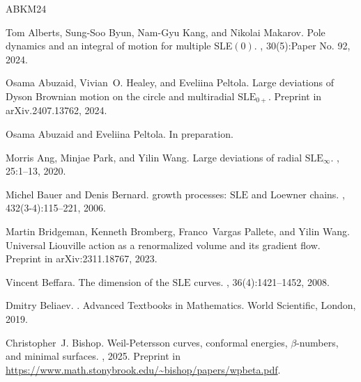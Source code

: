 \documentclass[a4paper, 11pt]{article}
\theoremstyle{definition}
\numberwithin{equation}{section}
\numberwithin{figure}{section}
\begin{document}

\bigskip


\begin{thebibliography}{ABKM24}

Tom Alberts, Sung-Soo Byun, Nam-Gyu Kang, and Nikolai Makarov.
\newblock Pole dynamics and an integral of motion for multiple {SLE$(0)$}.
, 30(5):Paper No. 92, 2024.

Osama Abuzaid, Vivian~O. Healey, and Eveliina Peltola.
\newblock Large deviations of {D}yson {B}rownian motion on the circle and
  multiradial {$\mathrm{SLE}_{0+}$}.
\newblock Preprint in arXiv.2407.13762, 2024.

Osama Abuzaid and Eveliina Peltola.
\newblock In preparation.

Morris Ang, Minjae Park, and Yilin Wang.
\newblock Large deviations of radial {${\mathrm{SLE}_{\infty}}$}.
, 25:1--13, 2020.

Michel Bauer and Denis Bernard.
 growth processes: {$\mathrm{SLE}$} and {L}oewner chains.
, 432(3-4):115--221, 2006.

Martin Bridgeman, Kenneth Bromberg, Franco~Vargas Pallete, and Yilin Wang.
\newblock Universal {L}iouville action as a renormalized volume and its
  gradient flow.
\newblock Preprint in arXiv:2311.18767, 2023.

Vincent Beffara.
\newblock The dimension of the {$\mathrm{SLE}$} curves.
, 36(4):1421--1452, 2008.

Dmitry Beliaev.
.
\newblock Advanced Textbooks in Mathematics. World Scientific, London, 2019.

Christopher~J. Bishop.
\newblock Weil-{P}etersson curves, conformal energies, {$\beta$}-numbers, and
  minimal surfaces.
, 2025.
\newblock Preprint in
  \url{https://www.math.stonybrook.edu/~bishop/papers/wpbeta.pdf}.


\end{thebibliography}
\end{document}
